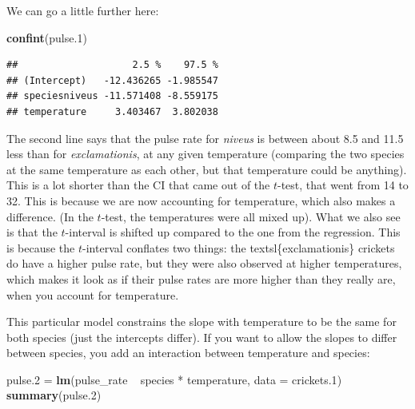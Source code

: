 \documentclass[]{tufte-book}
\newenvironment{Shaded}{}{}
\newcommand{\DataTypeTok}[1]{\textcolor[rgb]{0.56,0.13,0.00}{#1}}
\newcommand{\FloatTok}[1]{\textcolor[rgb]{0.25,0.63,0.44}{#1}}
\newcommand{\KeywordTok}[1]{\textcolor[rgb]{0.00,0.44,0.13}{\textbf{#1}}}
\newcommand{\NormalTok}[1]{#1}
\newcommand{\OperatorTok}[1]{\textcolor[rgb]{0.40,0.40,0.40}{#1}}
\newcommand{\StringTok}[1]{\textcolor[rgb]{0.25,0.44,0.63}{#1}}
\theoremstyle{definition}
\theoremstyle{definition}
\theoremstyle{definition}
\theoremstyle{remark}
\begin{document}
We can go a little further here:

\begin{Shaded}
\begin{Highlighting}[]
\KeywordTok{confint}\NormalTok{(pulse}\FloatTok{.1}\NormalTok{)}
\end{Highlighting}
\end{Shaded}

\begin{verbatim}
##                    2.5 %    97.5 %
## (Intercept)   -12.436265 -1.985547
## speciesniveus -11.571408 -8.559175
## temperature     3.403467  3.802038
\end{verbatim}

The second line says that the pulse rate for \emph{niveus} is between
about 8.5 and 11.5 less than for \emph{exclamationis}, at any given
temperature (comparing the two species at the same temperature as each
other, but that temperature could be anything). This is a lot shorter
than the CI that came out of the \(t\)-test, that went from 14 to 32.
This is because we are now accounting for temperature, which also makes
a difference. (In the \(t\)-test, the temperatures were all mixed up).
What we also see is that the \(t\)-interval is shifted up compared to
the one from the regression. This is because the \(t\)-interval
conflates  two things: the
textsl\{exclamationis\} crickets do have a higher pulse rate, but they
were also observed at higher temperatures, which makes it look as if
their pulse rates are more higher
 than they really
are, when you account for temperature.

This particular model constrains the slope with temperature to be the
same for both species (just the intercepts differ). If you want to allow
the slopes to differ between species, you add an interaction between
temperature and species:

\begin{Shaded}
\begin{Highlighting}[]
\NormalTok{pulse}\FloatTok{.2}\NormalTok{ =}\StringTok{ }\KeywordTok{lm}\NormalTok{(pulse_rate }\OperatorTok{~}\StringTok{ }\NormalTok{species }\OperatorTok{*}\StringTok{ }\NormalTok{temperature, }
    \DataTypeTok{data =}\NormalTok{ crickets}\FloatTok{.1}\NormalTok{)}
\KeywordTok{summary}\NormalTok{(pulse}\FloatTok{.2}\NormalTok{)}
\end{Highlighting}
\end{Shaded}
\end{document}
